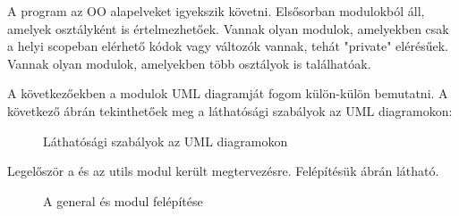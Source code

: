 
A program az OO alapelveket igyekszik követni. Elsősorban modulokból áll, amelyek osztályként is értelmezhetőek. Vannak olyan modulok, amelyekben csak a helyi scopeban elérhető kódok vagy változók vannak, tehát "private" elérésűek. Vannak olyan modulok, amelyekben több osztályok is találhatóak.

A következőekben a modulok UML diagramját fogom külön-külön bemutatni. A következő  ábrán tekinthetőek meg a láthatósági szabályok az UML diagramokon:
\begin{figure}[h!]
	\centering
	\caption{Láthatósági szabályok az UML diagramokon}
	\label{fig:visibilityrules}
\end{figure}


Legelőször a  és az utils modul került megtervezésre. Felépítésük  ábrán látható.

\begin{figure}[h!]
	\centering
	\caption{A general és  modul felépítése}
	\label{fig:generalandaptpackages}
\end{figure}

